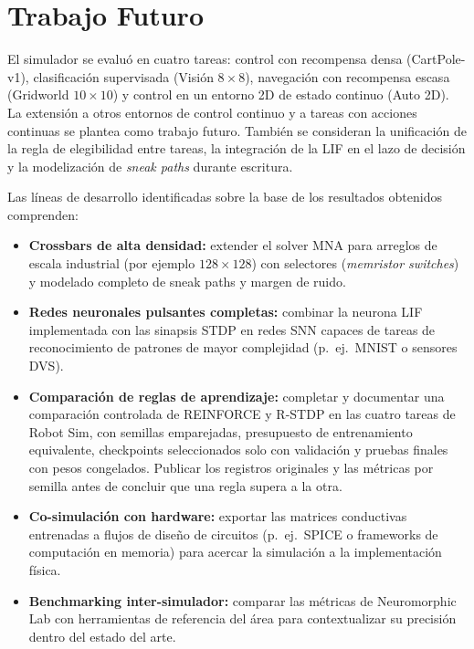 \section{Trabajo Futuro}

El simulador se evaluó en cuatro tareas: control con recompensa densa
(CartPole-v1), clasificación supervisada (Visión $8\times8$),
navegación con recompensa escasa (Gridworld $10\times10$) y control
en un entorno 2D de estado continuo (Auto 2D). La extensión a otros
entornos de control continuo y a tareas con acciones continuas se
plantea como trabajo futuro. También se consideran la unificación de
la regla de elegibilidad entre tareas, la integración de la LIF en el
lazo de decisión y la modelización de \textit{sneak paths} durante
escritura.

Las líneas de desarrollo identificadas sobre la base de los resultados
obtenidos comprenden:

\begin{itemize}
    \item \textbf{Crossbars de alta densidad:} extender el solver MNA para
    arreglos de escala industrial (por ejemplo $128 \times 128$) con
    selectores (\textit{memristor switches}) y modelado completo de sneak
    paths y margen de ruido.
    \item \textbf{Redes neuronales pulsantes completas:} combinar la
    neurona LIF implementada con las sinapsis STDP en redes SNN capaces de
    tareas de reconocimiento de patrones de mayor complejidad (p.\ ej.\
    MNIST o sensores DVS).
    \item \textbf{Comparación de reglas de aprendizaje:} completar y
    documentar una comparación controlada de REINFORCE y R-STDP en las
    cuatro tareas de Robot Sim, con semillas emparejadas, presupuesto de
    entrenamiento equivalente, checkpoints seleccionados solo con
    validación y pruebas finales con pesos congelados. Publicar los
    registros originales y las métricas por semilla antes de concluir
    que una regla supera a la otra.
    \item \textbf{Co-simulación con hardware:} exportar las matrices
    conductivas entrenadas a flujos de diseño de circuitos (p.\ ej.\
    SPICE o frameworks de computación en memoria) para acercar la simulación
    a la implementación física.
    \item \textbf{Benchmarking inter-simulador:} comparar las métricas de
    Neuromorphic Lab con herramientas de referencia del área para
    contextualizar su precisión dentro del estado del arte.
\end{itemize}
